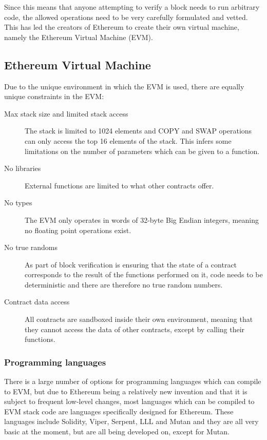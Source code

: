 \documentclass{article}
\begin{document}
		Since this means that anyone attempting to verify a block needs to run arbitrary code, the allowed operations need to be very carefully formulated and vetted. 
		This has led the creators of Ethereum to create their own virtual machine, namely the Ethereum Virtual Machine (EVM).  

		\subsection{Ethereum Virtual Machine}
		
		Due to the unique environment in which the EVM is used, there are equally unique constraints in the EVM:
		\begin{description}
			\item [Max stack size and limited stack access] The stack is limited to 1024 elements and COPY and SWAP operations can only access the top 16 elements of the stack. This infers some limitations on the number of parameters which can be given to a function.
			\item [No libraries] External functions are limited to what other contracts offer.  
			\item [No types] The EVM only operates in words of 32-byte Big Endian integers, meaning no floating point operations exist.
			\item [No true randoms] As part of block verification is ensuring that the state of a contract corresponds to the result of the functions performed on it, code needs to be deterministic and there are therefore no true random numbers.
			\item [Contract data access] All contracts are sandboxed inside their own environment, meaning that they cannot access the data of other contracts, except by calling their functions.
		\end{description}

		\subsubsection{Programming languages}

		There is a large number of options for programming languages which can compile to EVM, but due to Ethereum being a relatively new invention and that it is subject to frequent low-level changes, most languages which can be compiled to EVM stack code are languages specifically designed for Ethereum.
		These languages include Solidity, Viper, Serpent, LLL and Mutan and they are all very basic at the moment, but are all being developed on, except for Mutan.
\end{document}
